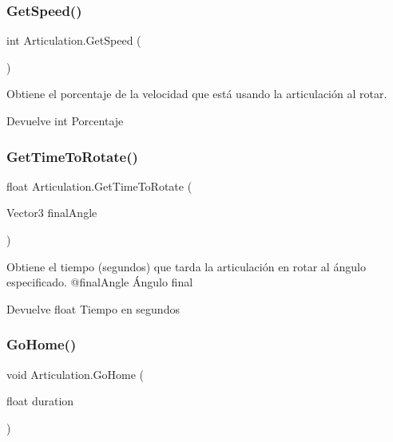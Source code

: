 \subsubsection{\texorpdfstring{GetSpeed()}{GetSpeed()}}
{\footnotesize\ttfamily int Articulation.\+Get\+Speed (\begin{DoxyParamCaption}{ }\end{DoxyParamCaption})\hspace{0.3cm}{\ttfamily [inline]}}

Obtiene el porcentaje de la velocidad que está usando la articulación al rotar. \begin{DoxyReturn}{Devuelve}
int Porcentaje 
\end{DoxyReturn}
\mbox{\label{class_articulation_a67d26d51e7a88fd6feea21cdd9f43db4}} 
\subsubsection{\texorpdfstring{GetTimeToRotate()}{GetTimeToRotate()}}
{\footnotesize\ttfamily float Articulation.\+Get\+Time\+To\+Rotate (\begin{DoxyParamCaption}\item[{Vector3}]{final\+Angle }\end{DoxyParamCaption})\hspace{0.3cm}{\ttfamily [inline]}}

Obtiene el tiempo (segundos) que tarda la articulación en rotar al ángulo especificado. @final\+Angle Ángulo final \begin{DoxyReturn}{Devuelve}
float Tiempo en segundos 
\end{DoxyReturn}
\mbox{\label{class_articulation_abe8a64163ae7fda2bcae5035ad1bfb75}} 
\subsubsection{\texorpdfstring{GoHome()}{GoHome()}}
{\footnotesize\ttfamily void Articulation.\+Go\+Home (\begin{DoxyParamCaption}\item[{float}]{duration }\end{DoxyParamCaption})\hspace{0.3cm}{\ttfamily [inline]}}

